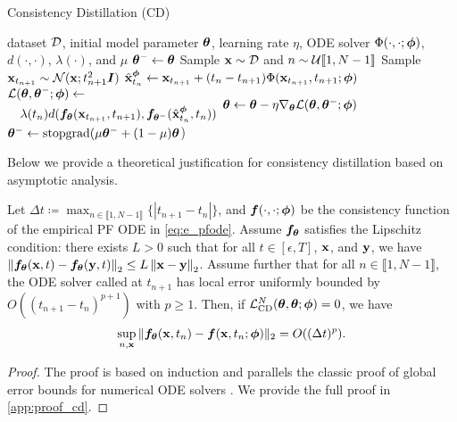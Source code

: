 \begin{algorithm}[tb]
    \caption{Consistency Distillation (CD)}\label{alg:distillation}
 \begin{algorithmic}
     dataset $\mathcal{D}$, initial model parameter ${\bm{\theta}}$, learning rate $\eta$, ODE solver $\Phi(\cdot, \cdot; {\bm{\phi}})$, $d(\cdot, \cdot)$, $\lambda(\cdot)$, and $\mu$
    \STATE ${\bm{\theta}}^- \gets {\bm{\theta}}$
    \REPEAT
    \STATE Sample ${\mathbf{x}} \sim \mathcal{D}$ and $n \sim \mathcal{U}\llbracket 1,N-1 \rrbracket$
    \STATE Sample ${\mathbf{x}}_{t_{n+1}} \sim \mathcal{N}({\mathbf{x}}; t_{n+1}^2 {\bm{I}})$
    \STATE $\hat{{\mathbf{x}}}_{t_n}^{\bm{\phi}} \gets {\mathbf{x}}_{t_{n+1}} + (t_n - t_{n+1})\Phi({\mathbf{x}}_{t_{n+1}}, t_{n+1}; {\bm{\phi}})$
    \vspace{0.33em}
    \STATE $\begin{multlined}
        \mcal{L}(\vtheta, \vtheta^{-}; \vphi) \gets \\ \lambda(t_n) d(\vf_\vtheta(\rvx_{t_{n+1}}, t_{n+1}), \vf_{\vtheta^-}(\hat{\rvx}_{t_n}^\vphi, t_n))
    \end{multlined}
    $
    \vspace{0.33em}
    \STATE ${\bm{\theta}} \gets {\bm{\theta}} - \eta \nabla_{\bm{\theta}} \mathcal{L}({\bm{\theta}}, {\bm{\theta}}^{-}; {\bm{\phi}})$
    \STATE ${\bm{\theta}}^- \gets \operatorname{stopgrad}(\mu {\bm{\theta}}^- + (1-\mu) {\bm{\theta}}$)
 \end{algorithmic}
 \end{algorithm}

Below we provide a theoretical justification for consistency distillation based on asymptotic analysis.

\begin{theorem}\label{thm:convergence}
    Let $\Delta t \coloneqq \max_{n \in \llbracket 1, N-1\rrbracket}\{|t_{n+1} - t_{n}|\}$, and ${\bm{f}}(\cdot,\cdot;{\bm{\phi}})$ be the consistency function of the empirical PF ODE in \cref{eq:e_pfode}. Assume ${\bm{f}}_{\bm{\theta}}$ satisfies the Lipschitz condition: there exists $L > 0$ such that for all $t \in [\epsilon, T]$, ${\mathbf{x}}$, and ${\mathbf{y}}$, we have $\left\lVert{\bm{f}}_{\bm{\theta}}({\mathbf{x}}, t) - {\bm{f}}_{\bm{\theta}}({\mathbf{y}}, t)\right\rVert_2 \leq L \left\lVert{\mathbf{x}} - {\mathbf{y}}\right\rVert_2$. Assume further that for all $n \in \llbracket 1, N-1 \rrbracket$, the ODE solver called at $t_{n+1}$ has local error uniformly bounded by $O((t_{n+1} - t_n)^{p+1})$ with $p\geq 1$. Then, if $\mathcal{L}_\text{CD}^N({\bm{\theta}}, {\bm{\theta}}; {\bm{\phi}}) = 0$, we have
    \begin{align*}
        \sup_{n, {\mathbf{x}}}\|{\bm{f}}_{{\bm{\theta}}}({\mathbf{x}}, t_n) - {\bm{f}}({\mathbf{x}}, t_n; {\bm{\phi}})\|_2 = O((\Delta t)^p).
    \end{align*}
\end{theorem}
\begin{proof}
    The proof is based on induction and parallels the classic proof of global error bounds for numerical ODE solvers \cite{suli2003introduction}. We provide the full proof in \cref{app:proof_cd}.
\end{proof}

